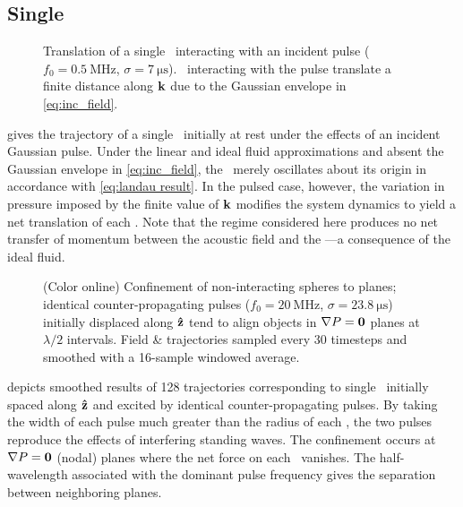 \subsection{Single \bubbles}

\begin{figure}
  \centering
  \caption{\label{fig:single_displacement}Translation of a single \bubble\ interacting with an incident pulse ($f_0 = \SI{0.5}{\mega\hertz}$, $\sigma = \SI{7}{\micro\second}$). \Bubbles\ interacting with the pulse translate a finite distance along $\vb{k}$ due to the Gaussian envelope in \cref{eq:inc_field}.}
\end{figure}

 gives the trajectory of a single \bubble\ initially at rest under the effects of an incident Gaussian pulse.
Under the linear and ideal fluid approximations and absent the Gaussian envelope in \cref{eq:inc_field}, the \bubble\ merely oscillates about its origin in accordance with \cref{eq:landau result}.
In the pulsed case, however, the variation in pressure imposed by the finite value of $\vb{k}$ modifies the system dynamics to yield a net translation of each \bubble.
Note that the regime considered here produces no net transfer of momentum between the acoustic field and the \bubble---a consequence of the ideal fluid.

\begin{figure}
  \centering
  \caption{\label{fig:planar_confinement}
  (Color online) Confinement of non-interacting spheres to planes; identical counter-propagating pulses ($f_0 = \SI{20}{\mega\hertz}$, $\sigma = \SI{23.8}{\micro\second}$) initially displaced along $\vu{z}$ tend to align objects in $\nabla P = \vb{0}$ planes at $\lambda/2$ intervals.
    Field \& trajectories sampled every 30 timesteps and smoothed with a 16-sample windowed average.
  }
\end{figure}

 depicts smoothed results of 128 trajectories corresponding to single \bubbles\ initially spaced along $\vu{z}$ and excited by identical counter-propagating pulses. 
By taking the width of each pulse much greater than the radius of each \bubble, the two pulses reproduce the effects of interfering standing waves. 
The confinement occurs at $\nabla P = \vb{0}$ (nodal) planes where the net force on each \bubble\ vanishes.
The half-wavelength associated with the dominant pulse frequency gives the separation between neighboring planes.

